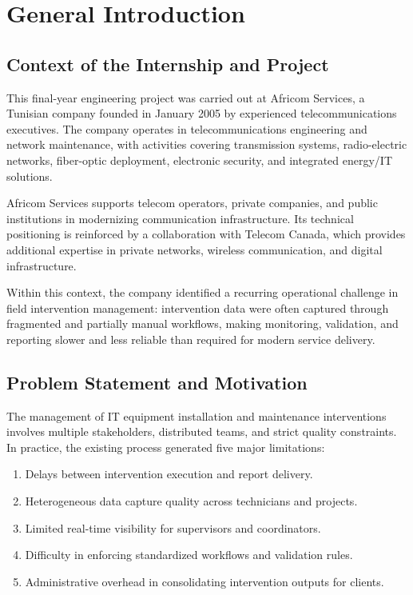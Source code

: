 \chapter*{General Introduction}

\section{Context of the Internship and Project}

This final-year engineering project was carried out at Africom Services, a Tunisian company founded in January 2005 by experienced telecommunications executives. The company operates in telecommunications engineering and network maintenance, with activities covering transmission systems, radio-electric networks, fiber-optic deployment, electronic security, and integrated energy/IT solutions.

Africom Services supports telecom operators, private companies, and public institutions in modernizing communication infrastructure. Its technical positioning is reinforced by a collaboration with Telecom Canada, which provides additional expertise in private networks, wireless communication, and digital infrastructure.

Within this context, the company identified a recurring operational challenge in field intervention management: intervention data were often captured through fragmented and partially manual workflows, making monitoring, validation, and reporting slower and less reliable than required for modern service delivery.

\section{Problem Statement and Motivation}

The management of IT equipment installation and maintenance interventions involves multiple stakeholders, distributed teams, and strict quality constraints. In practice, the existing process generated five major limitations:

\begin{enumerate}
\item Delays between intervention execution and report delivery.
\item Heterogeneous data capture quality across technicians and projects.
\item Limited real-time visibility for supervisors and coordinators.
\item Difficulty in enforcing standardized workflows and validation rules.
\item Administrative overhead in consolidating intervention outputs for clients.
\end{enumerate}

